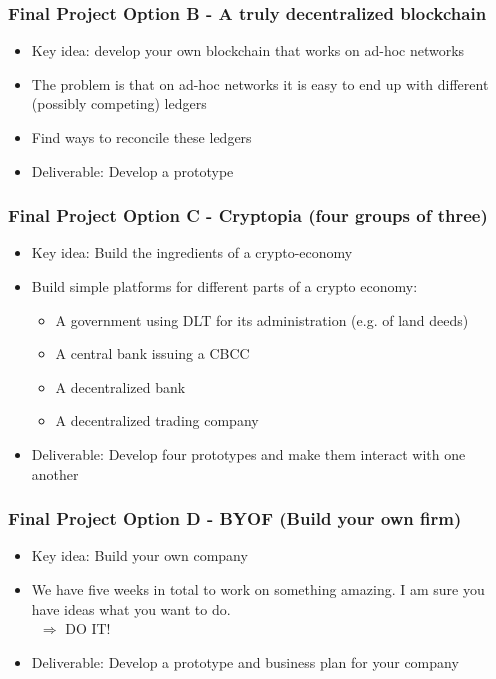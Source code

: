 \documentclass[11pt]{beamer}
\begin{document}
\begin{frame}
  \frametitle{Final Project Option B - A truly decentralized blockchain}
  \begin{itemize}\itemsep10pt
    \item Key idea: develop your own blockchain that works on ad-hoc networks
    \item The problem is that on ad-hoc networks it is easy to end up with different (possibly competing) ledgers
    \item Find ways to reconcile these ledgers
    \item Deliverable: Develop a prototype
  \end{itemize}
\end{frame}

\begin{frame}
  \frametitle{Final Project Option C - Cryptopia (four groups of three)}
  \begin{itemize}\itemsep10pt
    \item Key idea: Build the ingredients of a crypto-economy
    \item Build simple platforms for different parts of a crypto economy:
    \begin{itemize}\itemsep5pt
      \item A government using DLT for its administration (e.g. of land deeds)
      \item A central bank issuing a CBCC
      \item A decentralized bank
      \item A decentralized trading company
    \end{itemize}
    \item Deliverable: Develop four prototypes and make them interact with one another
  \end{itemize}
\end{frame}

\begin{frame}
  \frametitle{Final Project Option D - BYOF (Build your own firm)}
  \begin{itemize}\itemsep10pt
    \item Key idea: Build your own company
    \item We have five weeks in total to work on something amazing. I am sure you have ideas what you want to do.\\
    ~\hfill $\Rightarrow$ DO IT!
    \item Deliverable: Develop a prototype and business plan for your company
  \end{itemize}
\end{frame}
\end{document}
